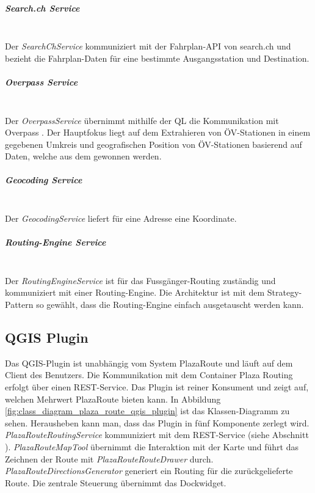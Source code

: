 \subparagraph{Search.ch Service}\label{architektur:Search.ch Service}~\\
Der \emph{SearchChService} kommuniziert mit der Fahrplan-\ac{API} von search.ch \cite{search_ch_route_api} und bezieht die Fahrplan-Daten für eine bestimmte Ausgangsstation und Destination.

\subparagraph{Overpass Service}\label{architektur:Overpass Service}~\\
Der \emph{OverpassService} übernimmt mithilfe der \ac{QL} die Kommunikation mit Overpass \cite{wiki:overpass}. Der Hauptfokus liegt auf dem Extrahieren von ÖV-Stationen in einem gegebenen Umkreis und geografischen Position von ÖV-Stationen basierend auf Daten, welche aus dem  gewonnen werden.

\subparagraph{Geocoding Service}\label{architektur:Geocoding Service}~\\
Der \emph{GeocodingService} liefert für eine Adresse eine Koordinate.

\subparagraph{Routing-Engine Service}\label{architektur:Routing-Engine Service}~\\
Der \emph{RoutingEngineService} ist für das Fussgänger-Routing zuständig und kommuniziert mit einer Routing-Engine. Die Architektur ist mit dem Strategy-Pattern \cite{gof_patterns} so gewählt, dass die Routing-Engine einfach ausgetauscht werden kann.

\subsection{QGIS Plugin}
\label{architektur:QGIS Plugin}

Das QGIS-Plugin ist unabhängig vom System PlazaRoute und läuft auf dem Client des Benutzers. Die Kommunikation mit dem Container Plaza Routing erfolgt über einen REST-Service. Das Plugin ist reiner Konsument und zeigt auf, welchen Mehrwert PlazaRoute bieten kann. In Abbildung \ref{fig:class_diagram_plaza_route_qgis_plugin} ist das Klassen-Diagramm zu sehen. Herausheben kann man, dass das Plugin in fünf Komponente zerlegt wird. \emph{PlazaRouteRoutingService} kommuniziert mit dem REST-Service (siehe Abschnitt ). \emph{PlazaRouteMapTool} übernimmt die Interaktion mit der Karte und führt das Zeichnen der Route mit \emph{PlazaRouteRouteDrawer} durch. \emph{PlazaRouteDirectionsGenerator} generiert ein Routing für die zurückgelieferte Route. Die zentrale Steuerung übernimmt das Dockwidget.

